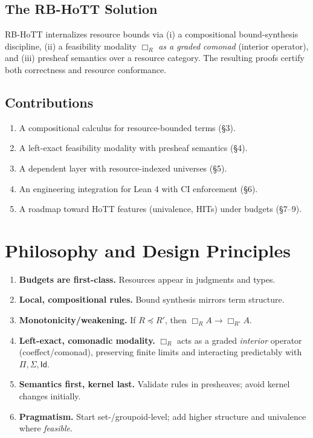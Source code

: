 \documentclass[11pt]{article}
\newcommand{\Id}{\mathsf{Id}}
\newcommand{\modal}[1]{\Box_{#1}}
\newcommand{\leqR}{\preceq}
\begin{document}
\subsection{The RB-HoTT Solution}
RB-HoTT internalizes resource bounds via (i) a compositional bound-synthesis discipline, (ii) a feasibility modality $\modal{R}$ \emph{as a graded comonad} (interior operator), and (iii) presheaf semantics over a resource category. The resulting proofs certify both correctness and resource conformance.

\subsection{Contributions}
\begin{enumerate}[leftmargin=2em]
  \item A compositional calculus for resource-bounded terms (\S3).
  \item A left-exact feasibility modality with presheaf semantics (\S4).
  \item A dependent layer with resource-indexed universes (\S5).
  \item An engineering integration for Lean 4 with CI enforcement (\S6).
  \item A roadmap toward HoTT features (univalence, HITs) under budgets (\S7--9).
\end{enumerate}

\section{Philosophy and Design Principles}
\label{sec:principles}
\begin{enumerate}[leftmargin=*,label=\textbf{P\arabic*.}]
  \item \textbf{Budgets are first-class.} Resources appear in judgments and types.
  \item \textbf{Local, compositional rules.} Bound synthesis mirrors term structure.
  \item \textbf{Monotonicity/weakening.} If $R\leqR R'$, then $\modal{R}A \to \modal{R'}A$.
  \item \textbf{Left-exact, comonadic modality.} $\modal{R}$ acts as a graded \emph{interior} operator (coeffect/comonad), preserving finite limits and interacting predictably with $\Pi,\Sigma,\Id$.
  \item \textbf{Semantics first, kernel last.} Validate rules in presheaves; avoid kernel changes initially.
  \item \textbf{Pragmatism.} Start set-/groupoid-level; add higher structure and univalence where \emph{feasible}.
\end{enumerate}
\end{document}
